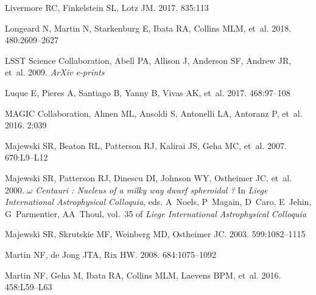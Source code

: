 \documentclass[a4paper]{ar-1col}
\begin{document}
\begin{thebibliography}{}
{Livermore} RC, {Finkelstein} SL, {Lotz} JM. 2017.
\textit{\apj} 835:113

{Longeard} N, {Martin} N, {Starkenburg} E, {Ibata} RA, {Collins} MLM, et~al.
  2018.
\textit{\mnras} 480:2609--2627

{LSST Science Collaboration}, {Abell} PA, {Allison} J, {Anderson} SF, {Andrew}
  JR, et~al. 2009.
\textit{ArXiv e-prints}

{Luque} E, {Pieres} A, {Santiago} B, {Yanny} B, {Vivas} AK, et~al. 2017.
\textit{\mnras} 468:97--108

{MAGIC Collaboration}, {Ahnen} ML, {Ansoldi} S, {Antonelli} LA, {Antoranz} P,
  et~al. 2016.
\textit{\jcap} 2:039

{Majewski} SR, {Beaton} RL, {Patterson} RJ, {Kalirai} JS, {Geha} MC, et~al.
  2007.
\textit{\apjl} 670:L9--L12

{Majewski} SR, {Patterson} RJ, {Dinescu} DI, {Johnson} WY, {Ostheimer} JC,
  et~al. 2000.
\textit{{{$\omega$} Centauri : Nucleus of a milky way dwarf spheroidal ?}} In
  \textit{Liege International Astrophysical Colloquia}, eds. A~{Noels},
  P~{Magain}, D~{Caro}, E~{Jehin}, G~{Parmentier}, AA~{Thoul}, vol.~35 of
  \textit{Liege International Astrophysical Colloquia}

{Majewski} SR, {Skrutskie} MF, {Weinberg} MD, {Ostheimer} JC. 2003.
\textit{\apj} 599:1082--1115

{Martin} NF, {de Jong} JTA, {Rix} HW. 2008.
\textit{\apj} 684:1075--1092

{Martin} NF, {Geha} M, {Ibata} RA, {Collins} MLM, {Laevens} BPM, et~al.
  2016{}.
\textit{\mnras} 458:L59--L63


\end{thebibliography}
\end{document}
